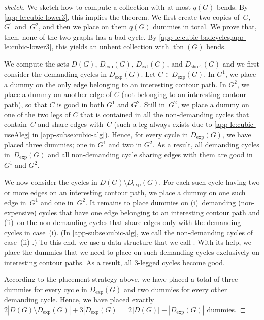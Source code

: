\documentclass[runningheads]{llncs}
\newcommand{\tbn}{\operatorname{tbn}}
\newcommand{\ext}{\operatorname{ext}}
\newcommand{\short}{\operatorname{short}}
\let\emph\relax\DeclareTextFontCommand{\emph}{\color{dark blue}\em}
\begin{document}
\begin{proof}[sketch]
We sketch how to compute a collection with at most $q(G)$ bends. 
By \cref{app-le:cubic-lower3}, this implies the theorem. 
We first create two copies of~$G$, $G^1$ and~$G^2$, and then we place on them $q(G)$ dummies in total. 
We prove that, then, none of the two graphs has a bad cycle.  
By \cref{app-le:cubic-badcycles,app-le:cubic-lower3}, this yields an unbent collection with $\tbn(G)$ bends.

We compute the sets $D(G)$, $D_{\exp}(G)$, $D_{\ext}(G)$, and $D_{\short}(G)$ and we first  consider the demanding cycles in $D_{\exp}(G)$. Let $C\in D_{\exp}(G)$. 
In $G^1$, we place a dummy on the only edge belonging to an interesting contour path. 
In $G^2$, we place a dummy on another edge of $C$ (not belonging to an interesting contour path), so that $C$ is good in both $G^1$ and $G^2$. 
Still in~$G^2$, we place a dummy on one of the two legs of $C$ that is contained in all the non-demanding cycles that contain~$C$ and share edges with~$C$ (such a leg always exists due to \cref{app-le:cubic-useAleg} in \cref{app-subse:cubic-alg}). 
Hence, for every cycle in $D_{\exp}(G)$, we have placed three dummies; one in $G^1$ and two in $G^2$. As a result, all demanding cycles in~$D_{\exp}(G)$ and all non-demanding cycle sharing edges with them are good in $G^1$ and $G^2$. 

We now consider the cycles in $D(G)\setminus D_{\exp}(G)$. 
For each such cycle having two or more edges on an interesting contour path, we place a dummy on one such edge in~$G^1$ and one in~$G^2$. 
It remains to place dummies on (i)~demanding (non-expensive) cycles that have one edge belonging to an interesting contour path and (ii)~on the non-demanding cycles that share edges only with the demanding cycles in case~(i).
(In \cref{app-subse:cubic-alg}, we call the non-demanding cycles of case~(ii) \emph{critical}.)
To this end, we use a data structure that we call \emph{enriched genealogical tree}.
With its help, we place the dummies that we need to place on such demanding cycles exclusively on interesting contour paths. 
As a result, all 3-legged cycles become good. 

According to the placement strategy above, we have placed a total of three dummies for every cycle in $D_{\exp}(G)$ and two dummies for every other demanding cycle.
Hence, we have placed exactly $2|D(G)\setminus D_{\exp}(G)|+3|D_{\exp}(G)|=2|D(G)|+|D_{\exp}(G)|$ dummies. 


\end{proof}
\end{document}
